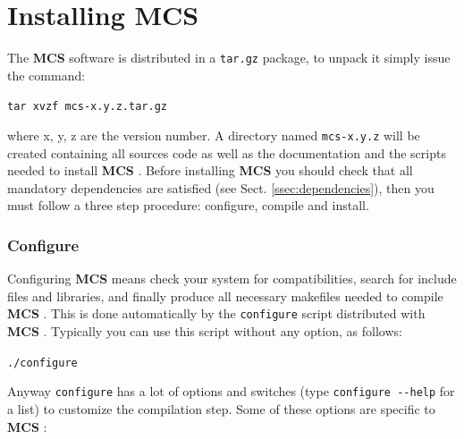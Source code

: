 \documentclass[12pt,titlepage]{book}
\newcommand{\mcs}{\textbf{MCS} }
\begin{document}
\section{Installing MCS}
\label{sec:installing}
The \mcs software is distributed in a \verb|tar.gz| package, to unpack
it simply issue the command:

\bigskip

\verb|tar xvzf mcs-x.y.z.tar.gz|

\bigskip

\noindent where x, y, z are the version number. A directory named
\verb|mcs-x.y.z| will be created containing all sources code as well
as the documentation and the scripts needed to install \mcs. Before
installing \mcs you should check that all mandatory dependencies are
satisfied (see Sect. \ref{ssec:dependencies}), then you must follow a
three step procedure: configure, compile and install.

\subsubsection{Configure}
\label{sssec:configuremcs}
Configuring \mcs means check your system for compatibilities, search
for include files and libraries, and finally produce all necessary
makefiles needed to compile \mcs. This is done automatically by the
\verb|configure| script distributed with \mcs. Typically you can use
this script without any option, as follows:

\bigskip

\verb|./configure|

\bigskip

\noindent Anyway \verb|configure| has a lot of options and switches
(type \verb|configure --help| for a list) to customize the compilation
step. Some of these options are specific to \mcs:
\end{document}
